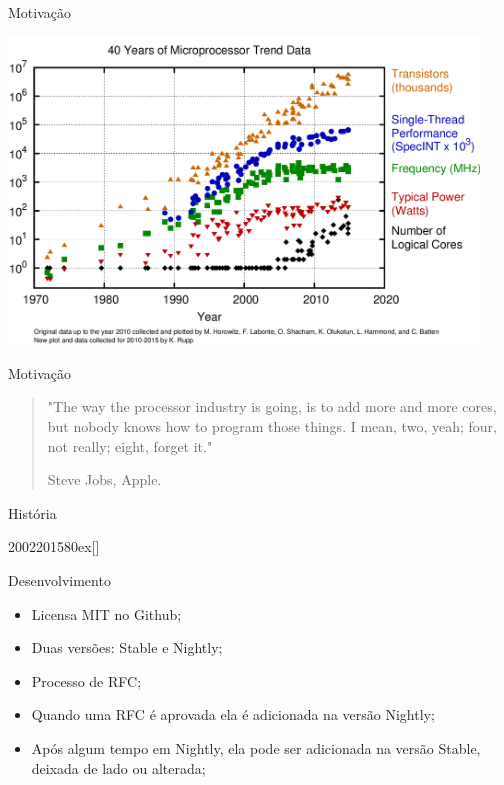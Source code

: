 \documentclass[aspectratio=169]{beamer}
\begin{document}
\begin{frame}{Motivação}
	\begin{center}
		\includegraphics[width=12.5cm]{imgs/cores-history.png}
	\end{center}
\end{frame}

\begin{frame}{Motivação}
	\begin{quote}
		"The way the processor industry is going, is to add more and more cores, but nobody knows how to program those things. I mean, two, yeah; four, not really; eight, forget it."
		
		\hspace{8.2cm}Steve Jobs, Apple.
	\end{quote}
\end{frame}

\begin{frame}{História}
	\begin{chronology}[5]{2002}{2015}{80ex}[\textwidth]
	\end{chronology}
\end{frame}

\begin{frame}{Desenvolvimento}
	\begin{itemize}
		\item Licensa MIT no Github;
		\item Duas versões: Stable e Nightly;
		\item Processo de RFC;
		\item Quando uma RFC é aprovada ela é adicionada na versão Nightly;
		\item Após algum tempo em Nightly, ela pode ser adicionada na versão Stable, deixada de lado ou alterada;	
	\end{itemize}
\end{frame}
\end{document}
